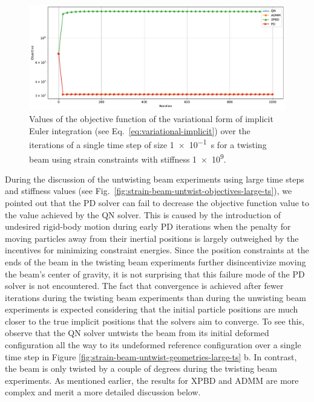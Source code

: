 \begin{figure}[h]
    \includegraphics[width=\textwidth]{figures/strain_beam_twist_typical_objectives.pdf}
    \caption{Values of the objective function of the variational form of implicit Euler integration (see Eq.\ \ref{eq:variational-implicit}) over the iterations of 
        a single time step of size \SI{1e-1}{\second} for a twisting beam using strain constraints with stiffness \num{1e9}.}
    \label{fig:strain-beam-twist-typical-objectives}
\end{figure}

During the discussion of the untwisting beam experiments using large time steps and stiffness values (see Fig.\ \ref{fig:strain-beam-untwist-objectives-large-ts}),
we pointed out that the PD solver can fail to decrease the objective function value to the value achieved by the QN solver. This is caused by the introduction of 
undesired rigid-body motion during early PD iterations when the penalty for moving particles away from their inertial positions is largely outweighed by the incentives 
for minimizing constraint energies. Since the position constraints at the ends of the beam in the twisting beam experiments further disincentivize moving the beam's 
center of gravity, it is not surprising that this failure mode of the PD solver is not encountered. The fact that convergence is achieved after fewer iterations 
during the twisting beam experiments than during the unwisting beam experiments is expected considering that the initial particle positions are much closer to the true 
implicit positions that the solvers aim to converge. To see this, observe that the QN solver untwists the beam from its initial deformed configuration all the way to its 
undeformed reference configuration over a single time step in Figure \ref{fig:strain-beam-untwist-geometries-large-ts} b. In contrast, the beam is only twisted by a 
couple of degrees during the twisting beam experiments. As mentioned earlier, the results for XPBD and ADMM are more complex and merit a more detailed discussion below.

